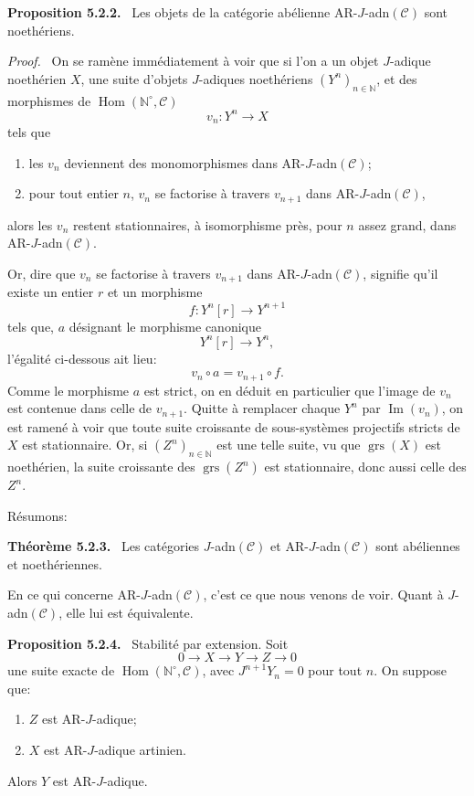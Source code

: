 \documentclass[11pt]{article}
\newenvironment{statement}[1]{\par\medskip\noindent\textbf{#1.}\ }{\par\medskip}
\newenvironment{prooftext}[1][Proof]{\par\noindent\emph{#1.}\ }{\par\medskip}
\DeclareMathOperator{\Hom}{Hom}
\providecommand{\Hom}{\operatorname{Hom}}
\providecommand{\Im}{\operatorname{Im}}
\renewcommand{\Im}{\operatorname{Im}}
\providecommand{\grs}{\operatorname{grs}}
\providecommand{\Im}{\operatorname{Im}}
\providecommand{\Hom}{\operatorname{Hom}}
\begin{document}
\begin{statement}{Proposition 5.2.2}
Les objets de la catégorie abélienne AR-\(J\)-adn\((\mathcal C)\) sont noethériens.
\end{statement}

\begin{prooftext}
On se ramène immédiatement à voir que si l'on a un objet \(J\)-adique noethérien \(X\), une suite d'objets \(J\)-adiques noethériens \((Y^n)_{n\in\mathbb N}\), et des morphismes de \(\Hom(\mathbb N^\circ,\mathcal C)\)
\[
v_n:Y^n\longrightarrow X
\]
tels que
\begin{enumerate}[label=\textup{(\roman*)}]
\item les \(v_n\) deviennent des monomorphismes dans AR-\(J\)-adn\((\mathcal C)\);
\item pour tout entier \(n\), \(v_n\) se factorise à travers \(v_{n+1}\) dans AR-\(J\)-adn\((\mathcal C)\),
\end{enumerate}
alors les \(v_n\) restent stationnaires, à isomorphisme près, pour \(n\) assez grand, dans AR-\(J\)-adn\((\mathcal C)\).

Or, dire que \(v_n\) se factorise à travers \(v_{n+1}\) dans AR-\(J\)-adn\((\mathcal C)\), signifie qu'il existe un entier \(r\) et un morphisme
\[
f:Y^n[r]\longrightarrow Y^{n+1}
\]
tels que, \(a\) désignant le morphisme canonique
\[
Y^n[r]\longrightarrow Y^n,
\]
l'égalité ci-dessous ait lieu:
\[
v_n\circ a=v_{n+1}\circ f .
\]
Comme le morphisme \(a\) est strict, on en déduit en particulier que l'image de \(v_n\) est contenue dans celle de \(v_{n+1}\). Quitte à remplacer chaque \(Y^n\) par \(\Im(v_n)\), on est ramené à voir que toute suite croissante de sous-systèmes projectifs stricts de \(X\) est stationnaire. Or, si \((Z^n)_{n\in\mathbb N}\) est une telle suite, vu que \(\grs(X)\) est noethérien, la suite croissante des \(\grs(Z^n)\) est stationnaire, donc aussi celle des \(Z^n\).
\end{prooftext}

Résumons:

\begin{statement}{Théorème 5.2.3}
Les catégories \(J\)-adn\((\mathcal C)\) et AR-\(J\)-adn\((\mathcal C)\) sont abéliennes et noethériennes.
\end{statement}

En ce qui concerne AR-\(J\)-adn\((\mathcal C)\), c'est ce que nous venons de voir. Quant à \(J\)-adn\((\mathcal C)\), elle lui est équivalente.

\begin{statement}{Proposition 5.2.4}
Stabilité par extension. Soit
\[
0\longrightarrow X\longrightarrow Y\longrightarrow Z\longrightarrow0
\]
une suite exacte de \(\Hom(\mathbb N^\circ,\mathcal C)\), avec \(J^{n+1}Y_n=0\) pour tout \(n\). On suppose que:
\begin{enumerate}[label=\textup{(\roman*)}]
\item \(Z\) est AR-\(J\)-adique;
\item \(X\) est AR-\(J\)-adique artinien.
\end{enumerate}
Alors \(Y\) est AR-\(J\)-adique.
\end{statement}
\end{document}
